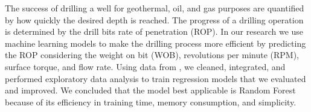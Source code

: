 {\large The success of drilling a well for geothermal, oil, and gas purposes are quantified by how quickly the desired depth is reached. The progress of a drilling operation is determined by the drill bits rate of penetration (ROP). In our research we use machine learning models to make the drilling process more efficient by predicting the ROP considering the  weight on bit (WOB), revolutions per minute (RPM), surface torque, and flow rate. Using data from \cite{oedi_1111}, we cleaned, integrated, and performed exploratory data analysis to train regression models that we evaluated and improved. We concluded that the model best applicable is Random Forest because of its efficiency in training time, memory consumption, and simplicity.}